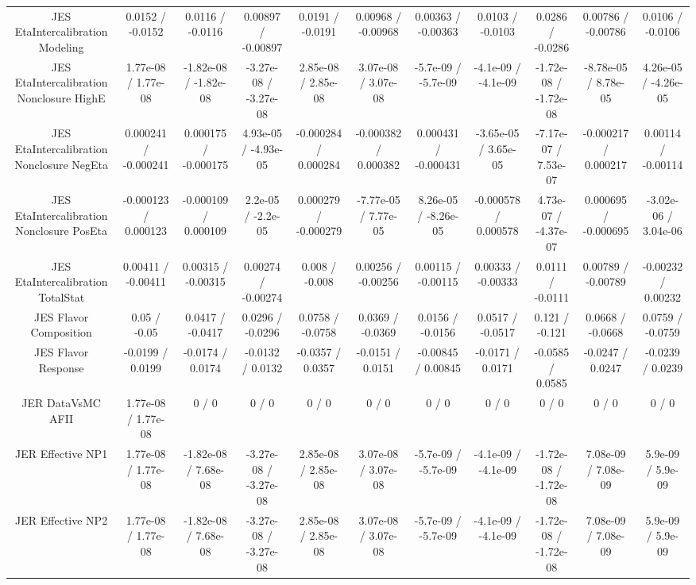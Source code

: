 \begin{table}[htbp]
\begin{center}
\begin{tabular}{|c|c|c|c|c|c|c|c|c|c|c|}
  JES EtaIntercalibration Modeling & 0.0152 / -0.0152 & 0.0116 / -0.0116 & 0.00897 / -0.00897 & 0.0191 / -0.0191 & 0.00968 / -0.00968 & 0.00363 / -0.00363 & 0.0103 / -0.0103 & 0.0286 / -0.0286 & 0.00786 / -0.00786 & 0.0106 / -0.0106 \\ 
  JES EtaIntercalibration Nonclosure HighE & 1.77e-08 / 1.77e-08 & -1.82e-08 / -1.82e-08 & -3.27e-08 / -3.27e-08 & 2.85e-08 / 2.85e-08 & 3.07e-08 / 3.07e-08 & -5.7e-09 / -5.7e-09 & -4.1e-09 / -4.1e-09 & -1.72e-08 / -1.72e-08 & -8.78e-05 / 8.78e-05 & 4.26e-05 / -4.26e-05 \\ 
  JES EtaIntercalibration Nonclosure NegEta & 0.000241 / -0.000241 & 0.000175 / -0.000175 & 4.93e-05 / -4.93e-05 & -0.000284 / 0.000284 & -0.000382 / 0.000382 & 0.000431 / -0.000431 & -3.65e-05 / 3.65e-05 & -7.17e-07 / 7.53e-07 & -0.000217 / 0.000217 & 0.00114 / -0.00114 \\ 
  JES EtaIntercalibration Nonclosure PosEta & -0.000123 / 0.000123 & -0.000109 / 0.000109 & 2.2e-05 / -2.2e-05 & 0.000279 / -0.000279 & -7.77e-05 / 7.77e-05 & 8.26e-05 / -8.26e-05 & -0.000578 / 0.000578 & 4.73e-07 / -4.37e-07 & 0.000695 / -0.000695 & -3.02e-06 / 3.04e-06 \\ 
  JES EtaIntercalibration TotalStat & 0.00411 / -0.00411 & 0.00315 / -0.00315 & 0.00274 / -0.00274 & 0.008 / -0.008 & 0.00256 / -0.00256 & 0.00115 / -0.00115 & 0.00333 / -0.00333 & 0.0111 / -0.0111 & 0.00789 / -0.00789 & -0.00232 / 0.00232 \\ 
  JES Flavor Composition & 0.05 / -0.05 & 0.0417 / -0.0417 & 0.0296 / -0.0296 & 0.0758 / -0.0758 & 0.0369 / -0.0369 & 0.0156 / -0.0156 & 0.0517 / -0.0517 & 0.121 / -0.121 & 0.0668 / -0.0668 & 0.0759 / -0.0759 \\ 
  JES Flavor Response & -0.0199 / 0.0199 & -0.0174 / 0.0174 & -0.0132 / 0.0132 & -0.0357 / 0.0357 & -0.0151 / 0.0151 & -0.00845 / 0.00845 & -0.0171 / 0.0171 & -0.0585 / 0.0585 & -0.0247 / 0.0247 & -0.0239 / 0.0239 \\ 
  JER DataVsMC AFII & 1.77e-08 / 1.77e-08 & 0 / 0 & 0 / 0 & 0 / 0 & 0 / 0 & 0 / 0 & 0 / 0 & 0 / 0 & 0 / 0 & 0 / 0 \\ 
  JER Effective NP1 & 1.77e-08 / 1.77e-08 & -1.82e-08 / 7.68e-08 & -3.27e-08 / -3.27e-08 & 2.85e-08 / 2.85e-08 & 3.07e-08 / 3.07e-08 & -5.7e-09 / -5.7e-09 & -4.1e-09 / -4.1e-09 & -1.72e-08 / -1.72e-08 & 7.08e-09 / 7.08e-09 & 5.9e-09 / 5.9e-09 \\ 
  JER Effective NP2 & 1.77e-08 / 1.77e-08 & -1.82e-08 / 7.68e-08 & -3.27e-08 / -3.27e-08 & 2.85e-08 / 2.85e-08 & 3.07e-08 / 3.07e-08 & -5.7e-09 / -5.7e-09 & -4.1e-09 / -4.1e-09 & -1.72e-08 / -1.72e-08 & 7.08e-09 / 7.08e-09 & 5.9e-09 / 5.9e-09 \\ 

\end{tabular}
\end{center}
\end{table}
